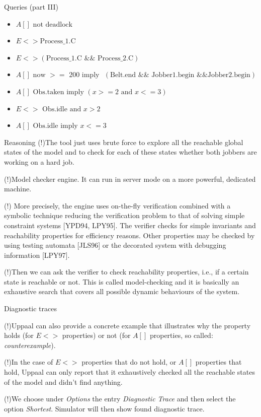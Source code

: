 \documentclass{beamer}
\begin{document}
\begin{frame}{Queries (part III)}
	\begin{itemize}
		\item $A[] \text{ not deadlock}$
		\item $E<> \text{Process\_1.C}$
		\item $E<> (\text{Process\_1.C } \&\& \text{ Process\_2.C})$
		\item $A[] \text{ now } >= \text{ 200 imply }$
		$(\text{Belt.end } \&\& \text{ Jobber1.begin } \&\& \text{Jobber2.begin})$
		\item $A[] \text{ Obs.taken imply } (x>=2 \text{ and } x<=3)$
		\item $E<> \text{ Obs.idle and } x>2$
		\item $A[] \text{ Obs.idle imply } x<=3$
		
	\end{itemize}
\end{frame}

\begin{frame}{Reasoning}
	(!)The tool just uses brute force to explore all the reachable global states of the model and to check for each of these	states whether both jobbers are working on a hard job.
	
	
	(!)Model checker engine. It can run in server mode on a more powerful, dedicated machine.

	(!) 
	More precisely, the engine uses on-the-fly verification combined with a symbolic technique reducing the verification problem to that of solving simple constraint systems [YPD94, LPY95]. The
	verifier checks for simple invariants and reachability properties for efficiency reasons. Other properties may be checked by using testing automata [JLS96] or the decorated system with debugging
	information [LPY97].
	
	(!)Then we can ask the verifier to check reachability properties, i.e., if a certain
	state is reachable or not. This is called model-checking and it is basically an exhaustive search
	that covers all possible dynamic behaviours of the system.
\end{frame}

\begin{frame}{Diagnostic traces}
	
	(!)Uppaal can also provide a concrete example that illustrates why the property holds (for $E<>$ properties) or not (for $A[]$ properties, so called: \textit{counterexample}).\newline
	
	(!)In the case of $E<>$ properties that do not hold, or $A[]$ properties that hold, Uppaal can only report that it exhaustively checked all the reachable states of the model and didn’t find anything.\newline
	
	(!)We choose under \textit{Options} the entry \textit{Diagnostic Trace} and then select the option \textit{Shortest}. Simulator will then show found diagnostic trace.
\end{frame}
\end{document}
